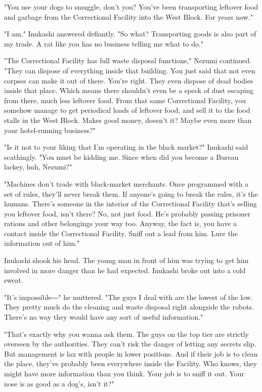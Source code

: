 "You use your dogs to smuggle, don't you? You've been transporting
leftover food and garbage from the Correctional Facility into the West
Block. For years now."

"I am," Inukashi answered defiantly. "So what? Transporting goods is
also part of my trade. A rat like you has no business telling me what to
do."

"The Correctional Facility has full waste disposal functions," Nezumi
continued. "They can dispose of everything inside that building. You
just said that not even corpses can make it out of there. You're right.
They even dispose of dead bodies inside that place. Which means there
shouldn't even be a speck of dust escaping from there, much less
leftover food. From that same Correctional Facility, you somehow manage
to get periodical loads of leftover food, and sell it to the food stalls
in the West Block. Makes good money, doesn't it? Maybe even more than
your hotel-running business?"

"Is it not to your liking that I'm operating in the black market?"
Inukashi said scathingly. "You must be kidding me. Since when did you
become a Bureau lackey, huh, Nezumi?"

"Machines don't trade with black-market merchants. Once programmed with
a set of rules, they'll never break them. If anyone's going to break the
rules, it's the humans. There's someone in the interior of the
Correctional Facility that's selling you leftover food, isn't there? No,
not just food. He's probably passing prisoner rations and other
belongings your way too. Anyway, the fact is, you have a contact inside
the Correctional Facility. Sniff out a lead from him. Lure the
information out of him."

Inukashi shook his head. The young man in front of him was trying to get
him involved in more danger than he had expected. Inukashi broke out
into a cold sweat.

"It's impossible―" he muttered. "The guys I deal with are the lowest of
the low. They pretty much do the cleaning and waste disposal right
alongside the robots. There's no way they would have any sort of useful
information."

"That's exactly why you wanna ask them. The guys on the top tier are
strictly overseen by the authorities. They can't risk the danger of
letting any secrets slip. But management is lax with people in lower
positions. And if their job is to clean the place, they've probably been
everywhere inside the Facility. Who knows, they might have more
information than you think. Your job is to sniff it out. Your nose is as
good as a dog's, isn't it?"

